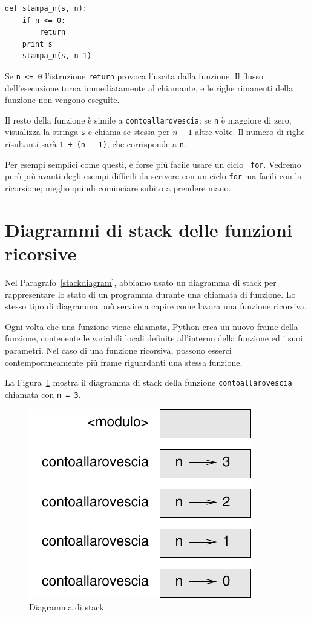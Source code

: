 \documentclass[10pt]{book}
\begin{document}
\begin{verbatim}
def stampa_n(s, n):
    if n <= 0:
        return
    print s
    stampa_n(s, n-1)
\end{verbatim}
%
Se {\tt n <= 0} l'istruzione {\tt return} provoca l'uscita dalla funzione. Il flusso dell'esecuzione torna immediatamente al chiamante, e le righe rimanenti della funzione non vengono eseguite.

Il resto della funzione è simile a {\tt contoallarovescia}: se {\tt n} è maggiore di zero, visualizza la stringa {\tt s} e chiama se stessa per $n-1$ altre volte. Il numero di righe risultanti sarà {\tt 1 + (n - 1)}, che corrisponde a
{\tt n}.

Per esempi semplici come questi, è forse più facile usare un ciclo {\tt
for}. Vedremo però più avanti degli esempi difficili da scrivere con un ciclo {\tt for} ma facili con la ricorsione; meglio quindi cominciare subito a prendere mano.



\section{Diagrammi di stack delle funzioni ricorsive}
\label{recursive.stack}

Nel Paragrafo~\ref{stackdiagram}, abbiamo usato un diagramma di stack per   rappresentare lo stato di un programma durante una chiamata di funzione. Lo stesso tipo di diagramma può servire a capire come lavora una funzione ricorsiva.

Ogni volta che una funzione viene chiamata, Python crea un nuovo frame della funzione, contenente le variabili locali definite all'interno della funzione ed i suoi parametri. Nel caso di una funzione ricorsiva, possono esserci contemporaneamente più frame riguardanti una stessa funzione.

La Figura~\ref{fig.stack2} mostra il diagramma di stack della funzione {\tt contoallarovescia} chiamata con {\tt n = 3}.

\begin{figure}
\centerline
{\includegraphics[scale=0.8]{figs/stack2.pdf}}
\caption{Diagramma di stack.}
\label{fig.stack2}
\end{figure}
\end{document}
